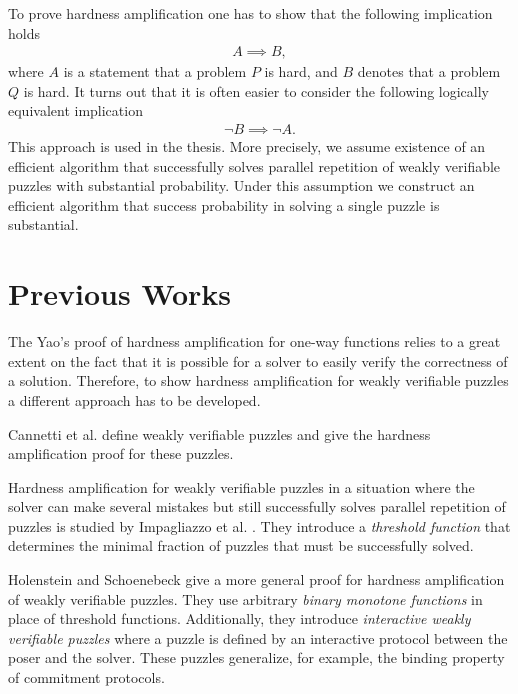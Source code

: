 To prove hardness amplification one has to show that the following implication holds
\begin{align*}
  A \implies B,
\end{align*}
where $A$ is a statement that a problem $P$ is hard, and $B$ denotes that a problem $Q$ is hard.
It turns out that it is often easier to consider the following logically equivalent implication
\begin{align*}
  \lnot B \implies \lnot A.
\end{align*}
This approach is used in the thesis. More precisely, we assume existence of an efficient algorithm that successfully
solves parallel repetition of weakly verifiable puzzles with substantial probability.
Under this assumption we construct an efficient algorithm that success probability in solving a single puzzle is substantial.

\section{Previous Works}
The Yao's proof of hardness amplification for one-way functions relies to a great extent on the fact that it is possible
for a solver to easily verify the correctness of a solution. Therefore, to show hardness amplification
for weakly verifiable puzzles a different approach has to be developed.

Cannetti et al. \cite{canetti2005hardness} define weakly verifiable puzzles and give the hardness amplification proof for these puzzles.

Hardness amplification for weakly verifiable puzzles in a situation where the solver can make several mistakes but still
successfully solves parallel repetition of puzzles is studied by Impagliazzo et al. \cite{impagliazzo2007chernoff}.
They introduce a \textit{threshold function} that determines the minimal fraction of puzzles that must be successfully solved.

Holenstein and Schoenebeck \cite{holenstein2011general} give a more general proof for hardness amplification
of weakly verifiable puzzles. They use arbitrary \textit{binary monotone functions} in place of threshold functions.
Additionally, they introduce \textit{interactive weakly verifiable puzzles} where a puzzle is defined by
an interactive protocol between the poser and the solver. These puzzles generalize, for example, the binding property of commitment protocols.

